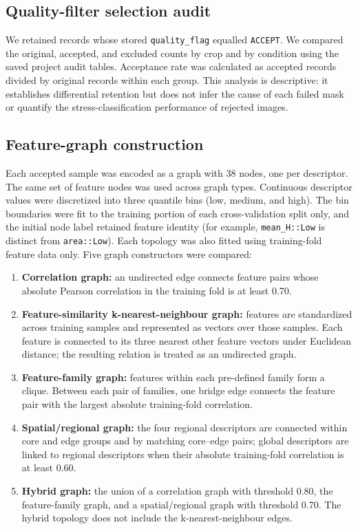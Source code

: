 \documentclass[conference]{IEEEtran}
\begin{document}
\subsection{Quality-filter selection audit}

We retained records whose stored \texttt{quality\_flag} equalled \texttt{ACCEPT}. We compared the original, accepted, and excluded counts by crop and by condition using the saved project audit tables. Acceptance rate was calculated as accepted records divided by original records within each group. This analysis is descriptive: it establishes differential retention but does not infer the cause of each failed mask or quantify the stress-classification performance of rejected images.

\subsection{Feature-graph construction}

Each accepted sample was encoded as a graph with 38 nodes, one per descriptor. The same set of feature nodes was used across graph types. Continuous descriptor values were discretized into three quantile bins (low, medium, and high). The bin boundaries were fit to the training portion of each cross-validation split only, and the initial node label retained feature identity (for example, \texttt{mean\_H::Low} is distinct from \texttt{area::Low}). Each topology was also fitted using training-fold feature data only. Five graph constructors were compared:

\begin{enumerate}
\item \textbf{Correlation graph:} an undirected edge connects feature pairs whose absolute Pearson correlation in the training fold is at least 0.70.
\item \textbf{Feature-similarity k-nearest-neighbour graph:} features are standardized across training samples and represented as vectors over those samples. Each feature is connected to its three nearest other feature vectors under Euclidean distance; the resulting relation is treated as an undirected graph.
\item \textbf{Feature-family graph:} features within each pre-defined family form a clique. Between each pair of families, one bridge edge connects the feature pair with the largest absolute training-fold correlation.
\item \textbf{Spatial/regional graph:} the four regional descriptors are connected within core and edge groups and by matching core--edge pairs; global descriptors are linked to regional descriptors when their absolute training-fold correlation is at least 0.60.
\item \textbf{Hybrid graph:} the union of a correlation graph with threshold 0.80, the feature-family graph, and a spatial/regional graph with threshold 0.70. The hybrid topology does not include the k-nearest-neighbour edges.
\end{enumerate}
\end{document}
